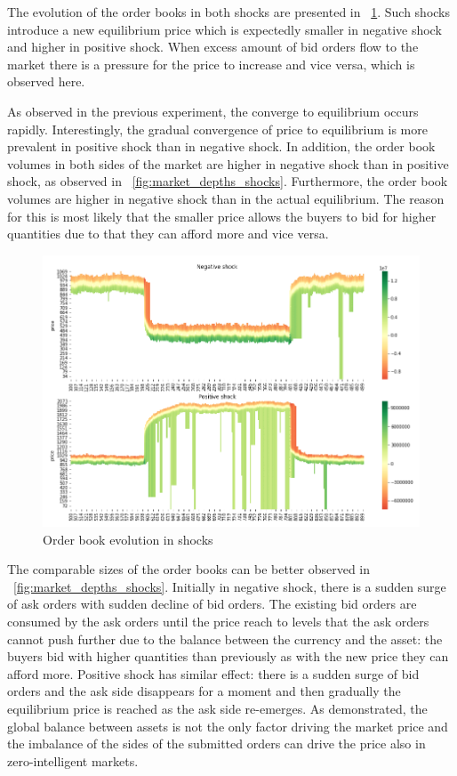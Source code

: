The evolution of the order books in both shocks are presented in ~\ref{fig:shocks_orderbook}. Such shocks introduce a new equilibrium
price which is expectedly smaller in negative shock and higher in positive shock. When excess amount of bid orders flow to the market
there is a pressure for the price to increase and vice versa, which is observed here. 

As observed in the previous experiment, the converge to equilibrium occurs rapidly. Interestingly, the gradual convergence of price
to equilibrium is more prevalent in positive shock than in negative shock. In addition, the order book volumes in both sides of the
market are higher in negative shock than in positive shock, as observed in ~\ref{fig:market_depths_shocks}. Furthermore, the order 
book volumes are higher in negative shock than in the actual equilibrium. The reason for this is most likely that the smaller price 
allows the buyers to bid for higher quantities due to that they can afford more and vice versa. 

\begin{figure}
    \includegraphics[width=\linewidth]{plots/shocks_order_book_evo.png}
    \caption{Order book evolution in shocks}
    \label{fig:shocks_orderbook}
\end{figure}

The comparable sizes of the order books can be better observed in ~\ref{fig:market_depths_shocks}. Initially in negative shock,
there is a sudden surge of ask orders with sudden decline of bid orders. The existing bid orders are consumed by the ask orders 
until the price reach to levels that the ask orders cannot push further due to the balance between the currency and the asset:
the buyers bid with higher quantities than previously as with the new price they can afford more. Positive shock has similar 
effect: there is a sudden surge of bid orders and the ask side disappears for a moment and then gradually the equilibrium
price is reached as the ask side re-emerges. As demonstrated, the global balance between assets is not the only factor driving the 
market price and the imbalance of the sides of the submitted orders can drive the price also in zero-intelligent markets.

